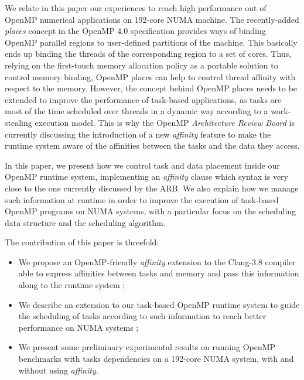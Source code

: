 \documentclass{Styles/llncs}
\begin{document}
 We relate in this paper our experiences to reach high performance out of OpenMP numerical applications on 192-core NUMA machine. The recently-added \emph{places} concept in the OpenMP 4.0 specification provides ways of binding OpenMP parallel regions to user-defined partitions of the machine. This basically ends up binding the threads of the corresponding region to a set of cores. Thus, relying on the first-touch memory allocation policy as a portable solution to control memory binding, OpenMP places can help to control thread affinity with respect to the memory.
However, the concept behind OpenMP places needs to be extended to improve the performance of task-based applications, as tasks are most of the time scheduled over threads in a dynamic way according to a work-stealing execution model.  This is why the OpenMP \emph{Architecture Review Board} is currently discussing the introduction of a new \textit{affinity} feature to make the runtime system aware of the affinities between the tasks and the data they access. 

In this paper, we present how we control task and data placement inside our OpenMP runtime system, implementing an \emph{affinity} clause which syntax is very close to the one currently discussed by the ARB. We also explain how we manage such information at runtime in order to improve the execution of task-based OpenMP programs on NUMA systems, with a particular focus on the scheduling data structure and the scheduling algorithm. 

The contribution of this paper is threefold:
\begin{itemize}
\item We propose an OpenMP-friendly \emph{affinity} extension to the Clang-3.8 compiler able to express affinities between tasks and memory and pass this information along to the runtime system ;
\item We describe an extension to our task-based OpenMP runtime system to guide the scheduling of tasks according to such information to reach better performance on NUMA systems ;
\item We present some preliminary experimental results on running OpenMP benchmarks with tasks dependencies on a 192-core NUMA system, with and without using \emph{affinity}.
\end{itemize}
\end{document}
